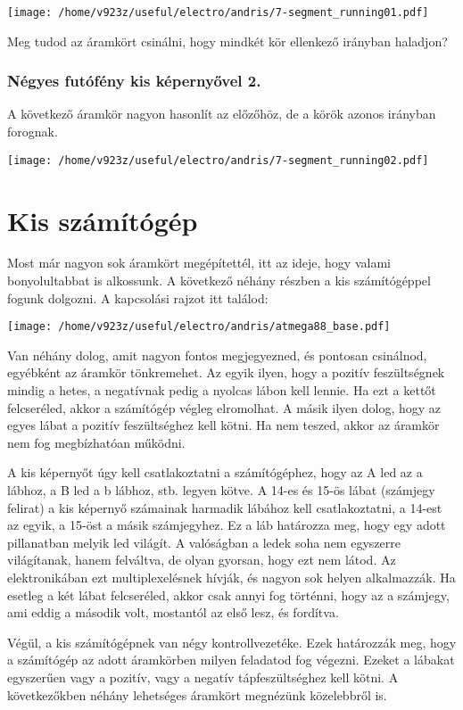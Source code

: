 \documentclass[16pt]{scrreprt}
\begin{document}
\texttt{[image: /home/v923z/useful/electro/andris/7-segment\_running01.pdf]}

Meg tudod az áramkört csinálni, hogy mindkét kör ellenkező irányban haladjon?

\subsubsection{Négyes futófény kis képernyővel 2.}

A következő áramkör nagyon hasonlít az előzőhöz, de a körök azonos irányban forognak.

\texttt{[image: /home/v923z/useful/electro/andris/7-segment\_running02.pdf]}

\section{Kis számítógép}

Most már nagyon sok áramkört megépítettél, itt az ideje, hogy valami bonyolultabbat is alkossunk. A következő néhány 
részben a kis számítógéppel fogunk dolgozni. A kapcsolási rajzot itt találod:

\texttt{[image: /home/v923z/useful/electro/andris/atmega88\_base.pdf]}

Van néhány dolog, amit nagyon fontos megjegyezned, és pontosan csinálnod, egyébként az áramkör tönkremehet. Az egyik 
ilyen, hogy a pozitív feszültségnek mindig a hetes, a negatívnak pedig a nyolcas lábon kell lennie. Ha ezt a kettőt 
felcseréled, akkor a számítógép végleg elromolhat. A másik ilyen dolog, hogy az egyes lábat a pozitív feszültséghez 
kell kötni. Ha nem teszed, akkor az áramkör nem fog megbízhatóan működni. 

A kis képernyőt úgy kell csatlakoztatni a számítógéphez, hogy az A led az a lábhoz, a B led a b lábhoz, stb. legyen 
kötve. A 14-es és 15-ös lábat (számjegy felirat) a kis képernyő számainak harmadik lábához kell csatlakoztatni, a 
14-est az egyik, a 15-öst a másik számjegyhez. Ez a láb határozza meg, hogy egy adott pillanatban melyik led világít. A 
valóságban a ledek soha nem egyszerre világítanak, hanem felváltva, de olyan gyorsan, hogy ezt nem látod. Az 
elektronikában ezt multiplexelésnek hívják, és nagyon sok helyen alkalmazzák. Ha esetleg a két lábat felcseréled, akkor 
csak annyi fog történni, hogy az a számjegy, ami eddig a második volt, mostantól az első lesz, és fordítva. 

Végül, a kis számítógépnek van négy kontrollvezetéke. Ezek határozzák meg, hogy a számítógép az adott áramkörben milyen 
feladatod fog végezni. Ezeket a lábakat egyszerűen vagy a pozitív, vagy a negatív tápfeszültséghez kell kötni. A 
következők\-ben néhány lehetséges áramkört megnézünk közelebbről is.
\end{document}
